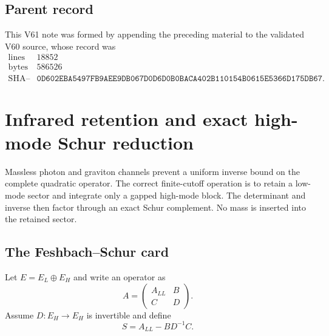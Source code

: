 \documentclass[11pt]{article}
\begin{document}
\subsection{Parent record}

This V61 note was formed by appending the preceding material to the
validated V60 source, whose record was
\[
\begin{array}{c|c}
\text{lines}&18852\\
\text{bytes}&586526\\
\text{SHA--256}&
\texttt{0D602EBA5497FB9AEE9DB067D0D6D0B0BACA402B110154B0615E5366D175DB67}.
\end{array}                                                     \tag{61.26}
\]


\section{Infrared retention and exact high-mode Schur reduction}
\label{sec:v11v62}

Massless photon and graviton channels prevent a uniform inverse bound
on the complete quadratic operator.  The correct finite-cutoff
operation is to retain a low-mode sector and integrate only a
gapped high-mode block.  The determinant and inverse then factor
through an exact Schur complement.  No mass is inserted into the
retained sector.

\subsection{The Feshbach--Schur card}

Let \(E=E_L\oplus E_H\) and write an operator as
\[
 A=\begin{pmatrix}
       A_{LL}&B\\
       C&D
   \end{pmatrix}.                                             \tag{62.1}
\]
Assume \(D:E_H\to E_H\) is invertible and define
\[
                              S=A_{LL}-BD^{-1}C.               \tag{62.2}
\]
\end{document}
